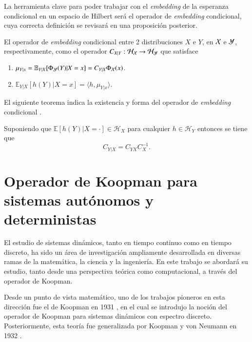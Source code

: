 La herramienta clave para poder trabajar con el \textit{embedding} de la esperanza condicional en un espacio de Hilbert será el operador de \textit{embedding} condicional, cuya correcta definición se revisará en una proposición posterior.
\begin{defn}
    El operador de \textit{embedding} condicional entre 2 distribuciones $X$ e $Y$, en $\mathcal{X}$ e $\mathcal{Y}$, respectivamente, como el operador $C_{X|Y} : \mathcal{H}_{\mathcal{X}} \to \mathcal{H}_{\mathcal{Y}}$ que satisface
    \begin{enumerate}
        \item $\mu_{Y|x} = \mathbb{E}_{Y|X}[\Phi_{\mathcal{Y}} (Y)|X=x] = C_{Y|X}\Phi_{\mathcal{X}} (x)$.
        \item $\mathbb{E}_{Y|X}[h(Y)|X=x] = \langle h, \mu_{Y|x} \rangle$.
    \end{enumerate}
\end{defn}
El siguiente teorema indica la existencia y forma del operador de \textit{embedding} condicional \cite{Fukumizu2004DimensionalitySpaces, Song2009HilbertSystems}.
\begin{teo}
    Suponiendo que \( \mathbb{E}[h(Y)|X = \cdot] \in \mathcal{H}_X \) para cualquier \( h \in \mathcal{H}_Y \) entonces se tiene que
    \[ C_{Y|X} = C_{YX} C_{X}^{-1}.\]
\end{teo}

\section{Operador de Koopman para sistemas autónomos y deterministas}

El estudio de sistemas dinámicos, tanto en tiempo continuo como en tiempo discreto, ha sido un área de investigación ampliamente desarrollada en diversas ramas de la matemática, la ciencia y la ingeniería. En este trabajo se abordará su estudio, tanto desde una perspectiva teórica como computacional, a través del operador de Koopman.  

Desde un punto de vista matemático, uno de los trabajos pioneros en esta dirección fue el de Koopman en 1931 \cite{Koopman1931HamiltonianSpace}, en el cual se introdujo la noción del operador de Koopman para sistemas dinámicos con espectro discreto. Posteriormente, esta teoría fue generalizada por Koopman y von Neumann en 1932 \cite{Koopman1932DynamicalSpectra}.  

